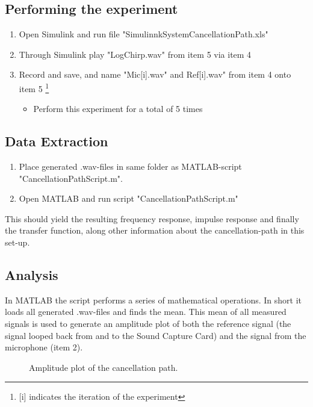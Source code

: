 \subsection{Performing the experiment}
\begin{enumerate}
	\item Open Simulink\textsuperscript{\textregistered} and run file "SimulinnkSystemCancellationPath.xls"
	\item Through Simulink\textsuperscript{\textregistered} play "LogChirp.wav" from item 5 via item 4
	\item Record and save, and name "Mic[i].wav" and Ref[i].wav" from item 4 onto item 5 \footnote{[i] indicates the iteration of the experiment}
	\begin{itemize}
		\item[] Perform this experiment for a total of 5 times
	\end{itemize}
\end{enumerate}


\subsection{Data Extraction}
\begin{enumerate}
	\item Place generated .wav-files in same folder as MATLAB\textsuperscript{\textregistered}-script "CancellationPathScript.m".
	\item Open MATLAB\textsuperscript{\textregistered} and run script "CancellationPathScript.m"
\end{enumerate}
This should yield the resulting frequency response, impulse response and finally the transfer function, along other information about the cancellation-path in this set-up.

\subsection{Analysis}
In MATLAB\textsuperscript{\textregistered} the script performs a series of mathematical operations. In short it loads all generated .wav-files and finds the mean. This mean of all measured signals is used to generate an amplitude plot of both the reference signal (the signal looped back from and to the Sound Capture Card) and the signal from the microphone (item 2).

\begin{figure}[H]
	\centering
	
	\caption{Amplitude plot of the cancellation path.}
	\label{AmplitudePlotCancellationPath}
\end{figure}

